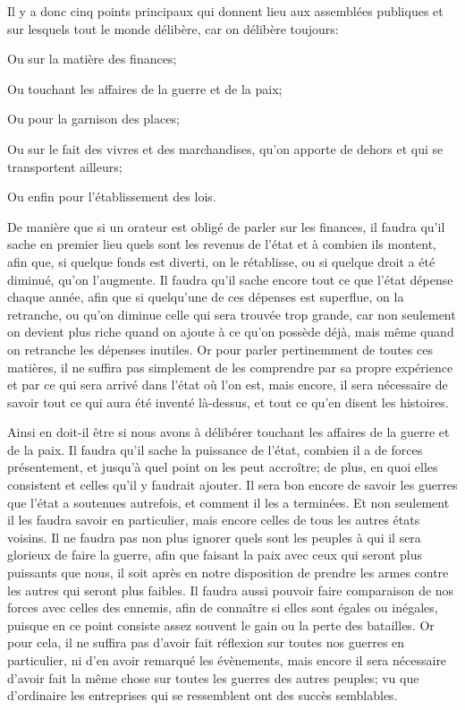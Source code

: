 \bigbreak

Il y a donc cinq points principaux qui donnent lieu aux assemblées publiques et sur lesquels tout le monde délibère, car
on délibère toujours:

\begin{emphpar}
	Ou sur la matière des finances;

	Ou touchant les affaires de la guerre et de la paix;

	Ou pour la garnison des places;

	Ou sur le fait des vivres et des marchandises, qu'on apporte de dehors et qui se transportent ailleurs;

	Ou enfin pour l'établissement des lois.
\end{emphpar}

De manière que si un orateur est obligé de parler sur les finances, il faudra qu'il sache en premier lieu quels sont les
revenus de l'état et à combien ils montent, afin que, si quelque fonds est diverti, on le rétablisse, ou si quelque droit a
été diminué, qu'on l'augmente. Il faudra qu'il sache encore tout ce que l'état dépense chaque année, afin que si quelqu'une
de ces dépenses est superflue, on la retranche, ou qu'on diminue celle qui sera trouvée trop grande, car non seulement on
devient plus riche quand on ajoute à ce qu'on possède déjà, mais même quand on retranche les dépenses inutiles. Or pour parler
pertinemment de toutes ces matières, il ne suffira pas simplement de les comprendre par sa propre expérience et par ce qui
sera arrivé dans l'état où l'on est, mais encore, il sera nécessaire de savoir tout ce qui aura été inventé là-dessus, et tout
ce qu'en disent les histoires.

Ainsi en doit-il être si nous avons à délibérer touchant les affaires de la guerre et de la paix. Il faudra qu'il sache la
puissance de l'état, combien il a de forces présentement, et jusqu'à quel point on les peut accroître; de plus, en quoi elles
consistent et celles qu'il y faudrait ajouter. Il sera bon encore de savoir les guerres que l'état a soutenues autrefois, et
comment il les a terminées. Et non seulement il les faudra savoir en particulier, mais encore celles de tous les autres états
voisins. Il ne faudra pas non plus ignorer quels sont les peuples à qui il sera glorieux de faire la guerre, afin que faisant
la paix avec ceux qui seront plus puissants que nous, il soit après en notre disposition de prendre les armes contre les autres
qui seront plus faibles. Il faudra aussi pouvoir faire comparaison de nos forces avec celles des ennemis, afin de connaître si
elles sont égales ou inégales, puisque en ce point consiste assez souvent le gain ou la perte des batailles. Or pour cela, il ne
suffira pas d'avoir fait réflexion sur toutes nos guerres en particulier, ni d'en avoir remarqué les évènements, mais encore il
sera nécessaire d'avoir fait la même chose sur toutes les guerres des autres peuples; vu que d'ordinaire les entreprises qui se
ressemblent ont des succès semblables.

